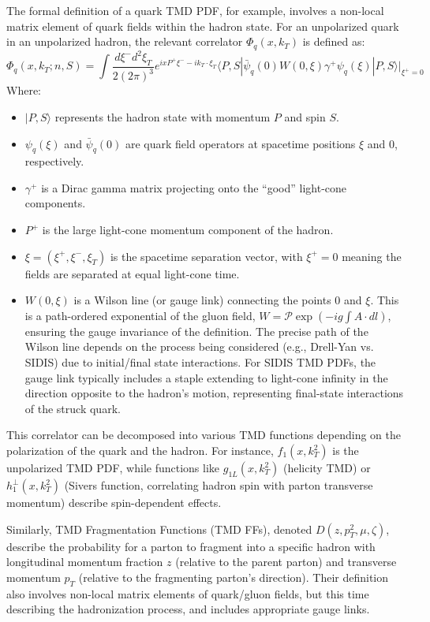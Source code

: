 \documentclass[11pt]{article}
\begin{document}
The formal definition of a quark TMD PDF, for example, involves a non-local matrix element of quark fields within the hadron state. For an
unpolarized quark in an unpolarized hadron, the relevant correlator $\Phi_q(x, k_T)$ is defined as:
\begin{equation}
  \Phi_q(x, k_T; n, S) = \int \frac{d\xi^{-} d^2\xi_T}{2(2\pi)^3} e^{i x P^{+} \xi^{-} - i k_T \cdot \xi_T} \langle P,S| \bar{\psi}_q(0) W(0, \xi) \gamma^{+} \psi_q(\xi) |P,S\rangle \Big|_{\xi^{+}=0}
  \label{eq:tmd_definition}
\end{equation}
Where:
\begin{itemize}
  \item $|P,S\rangle$ represents the hadron state with momentum $P$ and spin $S$.
  \item $\psi_q(\xi)$ and $\bar{\psi}_q(0)$ are quark field operators at spacetime positions $\xi$ and $0$, respectively.
  \item $\gamma^{+}$ is a Dirac gamma matrix projecting onto the ``good'' light-cone components.
  \item $P^{+}$ is the large light-cone momentum component of the hadron.
  \item $\xi = (\xi^{+}, \xi^{-}, \xi_T)$ is the spacetime separation vector, with $\xi^{+}=0$ meaning the fields are separated at equal light-cone time.
  \item $W(0, \xi)$ is a Wilson line (or gauge link) connecting the points $0$ and $\xi$. This is a path-ordered exponential of the gluon field, $W = \mathcal{P} \exp(-ig \int A\cdot dl)$, ensuring the gauge invariance of the definition. The precise path of the Wilson line depends on the process being considered (e.g., Drell-Yan vs. SIDIS) due to initial/final state interactions. For SIDIS TMD PDFs, the gauge link typically includes a staple extending to light-cone infinity in the direction opposite to the hadron's motion, representing final-state interactions of the struck quark.
\end{itemize}

This correlator can be decomposed into various TMD functions depending on the polarization of the quark and the hadron. For instance, $f_1(x, k_T^2)$
is the unpolarized TMD PDF, while functions like $g_{1L}(x, k_T^2)$ (helicity TMD) or $h_1^{\perp}(x, k_T^2)$ (Sivers function, correlating hadron
spin with parton transverse momentum) describe spin-dependent effects.

Similarly, TMD Fragmentation Functions (TMD FFs), denoted $D(z, p_T^2, \mu, \zeta)$, describe the probability for a parton to fragment into a
specific hadron with longitudinal momentum fraction $z$ (relative to the parent parton) and transverse momentum $p_T$ (relative to the fragmenting
parton's direction). Their definition also involves non-local matrix elements of quark/gluon fields, but this time describing the hadronization
process, and includes appropriate gauge links.
\end{document}
